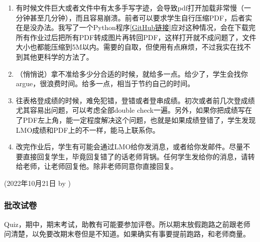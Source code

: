 \begin{enumerate}
    \item 有时候文件巨大或者文件中有太多手写字迹，会导致pdf打开加载非常慢（一分钟甚至几分钟），而且容易崩溃。前者可以要求学生自行压缩PDF，后者实在是没办法。我写了一个Python程序\href{https://github.com/kaiwu-astro/xp_pgrs_unofficial_guide/tree/main/fileshare/pdf_to_png_to_pdf.py}{[GitHub链接]}应对这种情况，会在下载完所有作业过后把所有PDF转成图片再转回PDF，这样打开就不成问题了，文件大小也都能压缩到5M以内。需要的自取，但使用有点麻烦，不过我实在找不到其他更科学的方法了。
    \item （悄悄说）拿不准给多少分合适的时候，就给多一点。给少了，学生会找你argue，很浪费时间。给多一点，相当于节约自己的时间。
    \item 往表格登成绩的时候，难免犯错，登错或者登串成绩。初次或者前几次登成绩尤其容易出问题，可以考虑全部double check一遍。另外，如果你把成绩写在了PDF左上角，能一定程度解决这个问题，也就是如果成绩登错了，学生发现LMO成绩和PDF上的不一样，能马上联系你。
    \item 改完作业后，学生有可能会通过LMO给你发消息，或者给你发邮件。尽量不要直接回复学生，毕竟回复错了的话老师背锅。任何学生发给你的消息，请转给老师，让老师回复他。除非老师同意你直接回复。
\end{enumerate}

\begin{flushright}
    (2022年10月21日 by \Wu)
\end{flushright}

\subsubsection{批改试卷}
Quiz，期中，期末考试，助教有可能要参加评卷。所以期末放假跑路之前跟老师问清楚，以免要改期末卷但是不知道。如果确实有事要提前跑路，和老师商量。

